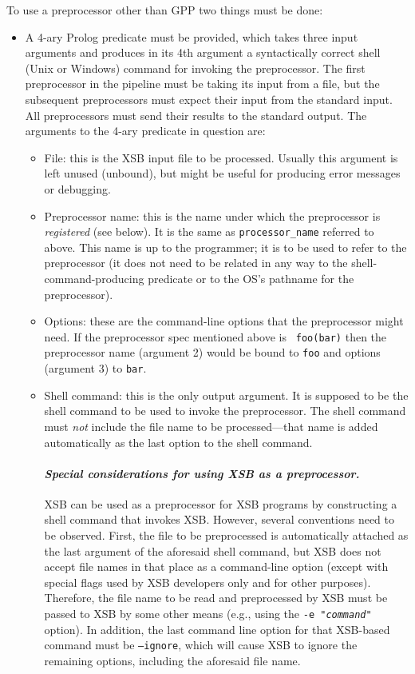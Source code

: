 \begin{description}
  To use a preprocessor other than GPP two things must be done:
  \begin{itemize}
  \item A 4-ary Prolog predicate must be provided, which takes three input
    arguments and produces in its 4th argument
    a syntactically correct shell (Unix or Windows)
    command for invoking the preprocessor. The first preprocessor in the
    pipeline 
    must be taking its input 
    from a file, but the subsequent preprocessors must expect their input from
    the standard input. All preprocessors must
    send their results to the standard
    output. The arguments to the 4-ary predicate in question are:
    \begin{itemize}
    \item   File: this is the XSB input file to be processed. Usually this
      argument is left unused (unbound), but might be useful for producing error
      messages or debugging.
    \item   Preprocessor name: this is the name under which the
      preprocessor is \emph{registered} (see below). It is the same as
      {\tt processor\_name} referred to above.  This name is  
      up to the programmer; it is
      to be used to refer to the preprocessor (it does not need to be
      related in any way to
      the shell-command-producing predicate or to the OS's pathname for the
      preprocessor).
    \item Options: these are the command-line options that the preprocessor
      might need. If the preprocessor spec mentioned above is {\tt
        foo(bar)} then the preprocessor name (argument 2) would be bound to
      {\tt foo} and options (argument 3) to {\tt bar}.
    \item Shell command: this is the only output argument. It is supposed
      to be the shell command to be used to invoke the preprocessor.
      The shell command must \emph{not} include the file name to be
      processed---that name is added automatically as the last option
      to the shell command.

      \paragraph{\it Special considerations for using XSB as a preprocessor.}
      XSB can be used as a preprocessor for XSB programs by constructing a
      shell command that invokes XSB. However, several conventions need to
      be observed. First, the file to be preprocessed is automatically
      attached as the last argument of the aforesaid shell command, but XSB
      does not accept file names in that place as a command-line option
      (except with special flags used by XSB developers only and for other
      purposes). Therefore, the file name to be read and preprocessed by
      XSB must be passed to XSB by some other means (e.g., using the
      \texttt{-e "\emph{command}"} option). In addition, the last command line
      option for that XSB-based command must be \texttt{--ignore}, which
      will cause XSB to ignore the remaining options, including the
      aforesaid file name.


\end{itemize}
\end{itemize}
\end{description}
